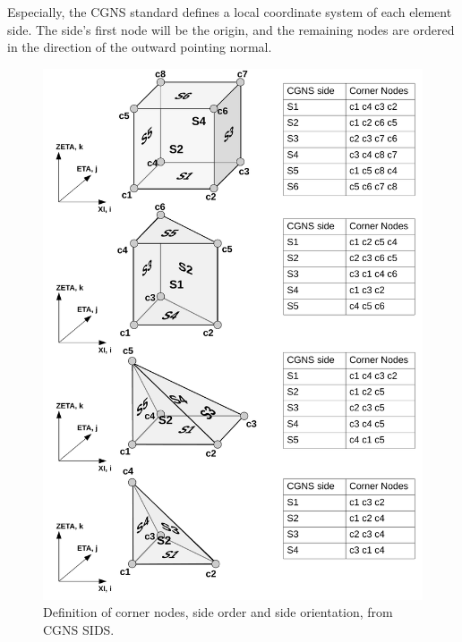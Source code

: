 \documentclass[a4paper,headsepline]{scrreprt}
\begin{document}
Especially, the CGNS standard defines a local coordinate system of each element side. The side's first node will be the origin, and the remaining nodes are ordered in the direction of the outward pointing normal.  


\begin{figure}[h!]
\centering
\includegraphics[height=0.9\textheight]{pics/CGNS.pdf} 
\caption{Definition of corner nodes, side order and side orientation, from CGNS SIDS. }
\label{fig:CGNS}
\end{figure}
\end{document}
